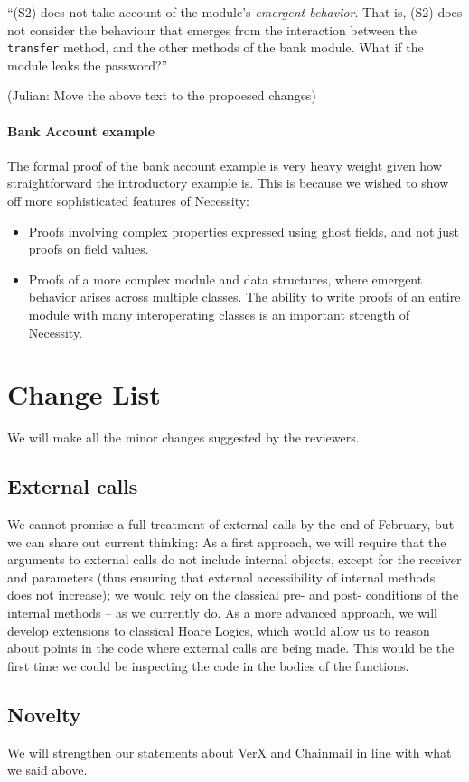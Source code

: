 \documentclass[11pt]{amsart}
\begin{document}
``(S2) does not take account of the module's \emph{emergent behavior}. That is, (S2) does not consider the behaviour that emerges from the interaction between the 
\texttt{transfer} method, and the other methods of the bank module. What if the module leaks the password?''

(Julian: Move the above text to the propoesed changes)

\paragraph{\textbf{Bank Account example}} The formal proof of the bank account example is very heavy weight given how straightforward the introductory example is. 
This is because we wished to show off more sophisticated features of Necessity:
\begin{itemize}
\item
Proofs involving complex properties expressed using ghost fields, and not just proofs on field values.
\item
Proofs of a more complex module and data structures, where emergent behavior arises across multiple 
classes. The ability to write proofs of an entire module with many interoperating classes is an important strength of Necessity.
\end{itemize}

 \section{Change List}
  We will make all the minor changes suggested by the reviewers.
 \subsection*{External calls}
 We cannot promise a full treatment of external calls by the end of February, but we can share out current thinking:  As a first approach, we will require that the arguments to external calls do not include internal objects, except for the receiver and parameters (thus ensuring that external accessibility of internal methods does not increase); we would rely on the classical pre- and post- conditions of the internal methods -- as we currently do. As a more advanced approach, we will develop extensions to classical Hoare Logics, which would allow us to reason about points in the code where external calls are being made. This would be the first time we could be inspecting the code in the bodies of the functions.
 \subsection*{Novelty}
 We will strengthen our statements about VerX and Chainmail in line with what we said above.
 
\end{document}
